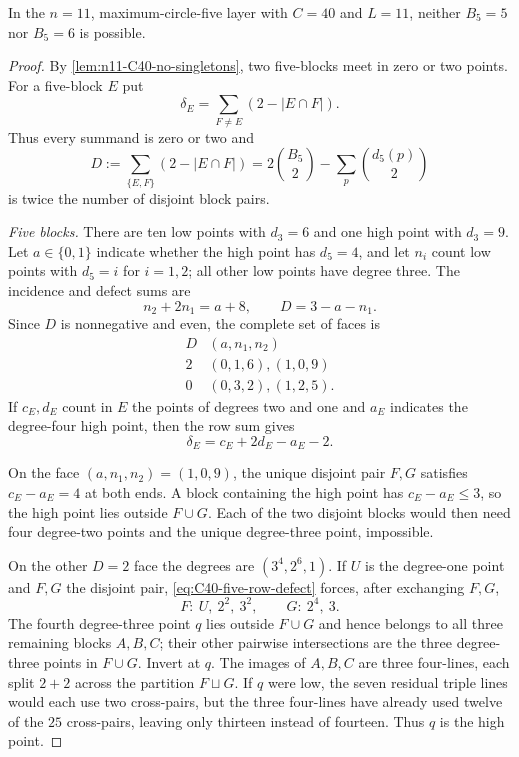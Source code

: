 \begin{lemma}[The $C=40,L=11$ defect--harmonic faces]
\label{lem:n11-C40-smallfaces}
In the $n=11$, maximum-circle-five layer with $C=40$ and $L=11$, neither
$B_5=5$ nor $B_5=6$ is possible.
\end{lemma}

\begin{proof}
By \cref{lem:n11-C40-no-singletons}, two five-blocks meet in zero or two
points.
For a five-block $E$ put
\[
 \delta_E=\sum_{F\ne E}(2-|E\cap F|).
\]
Thus every summand is zero or two and
\[
 D:=\sum_{\{E,F\}}(2-|E\cap F|)
   =2\binom{B_5}{2}-\sum_p\binom{d_5(p)}2
\]
is twice the number of disjoint block pairs.

\smallskip
\noindent\emph{Five blocks.}
There are ten low points with $d_3=6$ and one high point with $d_3=9$.
Let $a\in\{0,1\}$ indicate whether the high point has $d_5=4$, and let
$n_i$ count low points with $d_5=i$ for $i=1,2$; all other low points have
degree three.  The incidence and defect sums are
\[
 n_2+2n_1=a+8,\qquad D=3-a-n_1.
\]
Since $D$ is nonnegative and even, the complete set of faces is
\[
\begin{array}{c|c}
D&(a,n_1,n_2)\\ \hline
2&(0,1,6),(1,0,9)\\
0&(0,3,2),(1,2,5).
\end{array}
\]
If $c_E,d_E$ count in $E$ the points of degrees two and one and $a_E$
indicates the degree-four high point, then the row sum gives
\begin{equation}\label{eq:C40-five-row-defect}
 \delta_E=c_E+2d_E-a_E-2.
\end{equation}

On the face $(a,n_1,n_2)=(1,0,9)$, the unique disjoint pair $F,G$
satisfies $c_E-a_E=4$ at both ends.  A block containing the high point has
$c_E-a_E\le3$, so the high point lies outside $F\cup G$.  Each of the two
disjoint blocks would then need four degree-two points and the unique
degree-three point, impossible.

On the other $D=2$ face the degrees are $(3^4,2^6,1)$.  If $U$ is the
degree-one point and $F,G$ the disjoint pair, \eqref{eq:C40-five-row-defect}
forces, after exchanging $F,G$,
\[
 F:\ U,\ 2^2,\ 3^2,\qquad G:\ 2^4,\ 3.
\]
The fourth degree-three point $q$ lies outside $F\cup G$ and hence belongs
to all three remaining blocks $A,B,C$; their other pairwise intersections
are the three degree-three points in $F\cup G$.  Invert at $q$.  The images
of $A,B,C$ are three four-lines, each split $2+2$ across the partition
$F\sqcup G$.  If $q$ were low, the seven residual triple lines would each
use two cross-pairs, but the three four-lines have already used twelve of
the $25$ cross-pairs, leaving only thirteen instead of fourteen.  Thus $q$
is the high point.


\end{proof}
